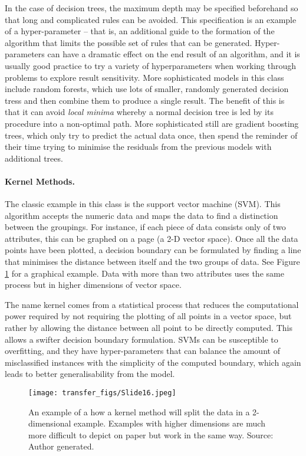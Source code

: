 In the case of decision trees, the maximum depth may be specified beforehand so that long and complicated rules can be avoided. This specification is an example of a hyper-parameter – that is, an additional guide to the formation of the algorithm that limits the possible set of rules that can be generated. Hyper-parameters can have a dramatic effect on the end result of an algorithm, and it is usually good practice to try a variety of hyperparameters when working through problems to explore result sensitivity. More sophisticated models in this class include random forests, which use lots of smaller, randomly generated decision tress and then combine them to produce a single result. The benefit of this is that it can avoid  \emph{local minima} whereby a normal decision tree is led by its procedure into a non-optimal path. More sophisticated still are gradient boosting trees, which only try to predict the actual data once, then spend the reminder of their time trying to minimise the residuals from the previous models with additional trees.



\paragraph{Kernel Methods.} The classic example in this class is the support vector machine (SVM). This algorithm accepts the numeric data and maps the data to find a distinction between the groupings. For instance, if each piece of data consists only of two attributes, this can be graphed on a page (a 2-D vector space). Once all the data points have been plotted, a decision boundary can be formulated by finding a line that minimises the distance between itself and the two groups of data. See Figure \ref{fig:svm} for a graphical example. Data with more than two attributes uses the same process but in higher dimensions of vector space.

The name kernel comes from a statistical process that reduces the computational power required by not requiring the plotting of all points in a vector space, but rather by allowing the distance between all point to be directly computed. This allows a swifter decision boundary formulation. SVMs can be susceptible to overfitting, and they have hyper-parameters that can balance the amount of misclassified instances with the simplicity of the computed boundary, which again leads to better generalisability from the model. 


\begin{figure}
  \texttt{[image: transfer\_figs/Slide16.jpeg]}
  \caption[Kernel Methods Example.]{An example of a how a kernel method will split the data in a 2-dimensional example. Examples with higher dimensions are much more difficult to depict on paper but work in the same way.  Source: Author generated.}
  \label{fig:svm}
\end{figure}

